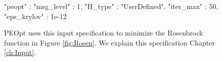 \begin{figure}
    \begin{lstPeoptJSON}
{
   "peopt" : {
      "msg_level" : 1,
      "H_type" : "UserDefined",
      "iter_max" : 50,
      "eps_krylov" : 1e-12
   }
}
\end{lstPeoptJSON}
    \caption{PEOpt uses this input specification to minimize the Rosenbrock function in Figure \ref{fig:Rosen}.  We explain this specification Chapter \ref{ch:Input}.} 
    \label{fig:RosenJSON}
\end{figure}
